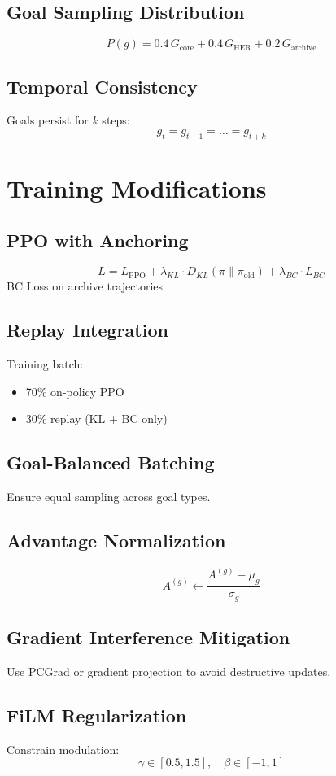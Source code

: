 \documentclass[11pt]{article}
\begin{document}
\subsection{Goal Sampling Distribution}
\[
P(g) = 0.4\,G_{\text{core}} + 0.4\,G_{\text{HER}} + 0.2\,G_{\text{archive}}
\]

\subsection{Temporal Consistency}
Goals persist for $k$ steps:
\[
g_t = g_{t+1} = \dots = g_{t+k}
\]

\section{Training Modifications}

\subsection{PPO with Anchoring}
\[
L = L_{\text{PPO}} + \lambda_{KL} \cdot D_{KL}(\pi \| \pi_{\text{old}}) + \lambda_{BC} \cdot L_{BC}
\]
BC Loss on archive trajectories
\subsection{Replay Integration}
Training batch:
\begin{itemize}[noitemsep]
\item 70\% on-policy PPO
\item 30\% replay (KL + BC only)
\end{itemize}

\subsection{Goal-Balanced Batching}
Ensure equal sampling across goal types.

\subsection{Advantage Normalization}
\[
A^{(g)} \leftarrow \frac{A^{(g)} - \mu_g}{\sigma_g}
\]

\subsection{Gradient Interference Mitigation}
Use PCGrad or gradient projection to avoid destructive updates.

\subsection{FiLM Regularization}
Constrain modulation:
\[
\gamma \in [0.5, 1.5], \quad \beta \in [-1, 1]
\]
\end{document}
